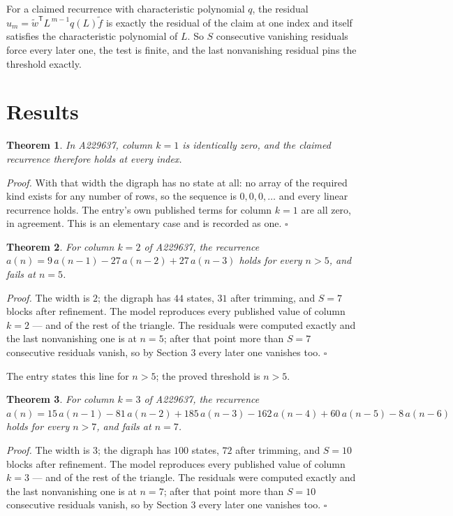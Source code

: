 \documentclass[11pt]{article}
\newtheorem{theorem}{Theorem}
\theoremstyle{definition}
\begin{document}
For a claimed recurrence with characteristic polynomial $q$, the residual $u_m = \tilde w^{\mathsf T}L^{\,m-1}q(L)\tilde f$ is exactly the residual of the claim at one index and itself satisfies the characteristic polynomial of $L$. So $S$ consecutive vanishing residuals force every later one, the test is finite, and the last nonvanishing residual pins the threshold exactly.

\section{Results}

\begin{theorem} In A229637, column $k = 1$ is identically zero, and the claimed recurrence therefore holds at every index.\end{theorem}

{\itshape Proof.} With that width the digraph has no state at all: no array of the required kind exists for any number of rows, so the sequence is $0,0,0,\dots$ and every linear recurrence holds. The entry's own published terms for column $k = 1$ are all zero, in agreement. This is an elementary case and is recorded as one. $\square$

\begin{theorem} For column $k = 2$ of A229637, the recurrence $a(n) = 9\,a(n-1) - 27\,a(n-2) + 27\,a(n-3)$ holds for every $n > 5$, and fails at $n = 5$.\end{theorem}

{\itshape Proof.} The width is $2$; the digraph has $44$ states, $31$ after trimming, and $S = 7$ blocks after refinement. The model reproduces every published value of column $k = 2$ --- and of the rest of the triangle. The residuals were computed exactly and the last nonvanishing one is at $n = 5$; after that point more than $S = 7$ consecutive residuals vanish, so by Section 3 every later one vanishes too. $\square$

The entry states this line for $n > 5$; the proved threshold is $n > 5$.

\begin{theorem} For column $k = 3$ of A229637, the recurrence $a(n) = 15\,a(n-1) - 81\,a(n-2) + 185\,a(n-3) - 162\,a(n-4) + 60\,a(n-5) - 8\,a(n-6)$ holds for every $n > 7$, and fails at $n = 7$.\end{theorem}

{\itshape Proof.} The width is $3$; the digraph has $100$ states, $72$ after trimming, and $S = 10$ blocks after refinement. The model reproduces every published value of column $k = 3$ --- and of the rest of the triangle. The residuals were computed exactly and the last nonvanishing one is at $n = 7$; after that point more than $S = 10$ consecutive residuals vanish, so by Section 3 every later one vanishes too. $\square$
\end{document}
